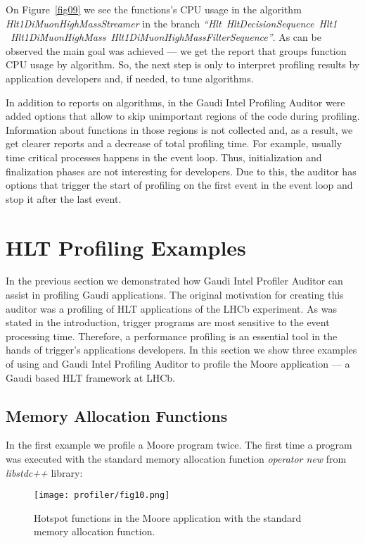 On Figure~\ref{fig09} we see the functions's CPU usage  in the algorithm {\it
Hlt1DiMuonHighMassStreamer\/} in the branch {\it ``Hlt~HltDecisionSequence~Hlt1
~Hlt1DiMuonHighMass~Hlt1DiMuonHighMassFilterSequence''}. As can be observed the
main goal was achieved --- we get the report that groups function CPU usage by
algorithm. So, the next step is only to interpret profiling results by
application developers and, if needed, to tune algorithms.

In addition to reports on algorithms, in the Gaudi Intel Profiling Auditor were
added options that allow to skip unimportant regions of the code during
profiling. Information about functions in those regions is not collected and,
as a result, we get clearer reports and a decrease of total profiling time. For
example, usually time critical processes happens in the event loop. Thus,
initialization and finalization phases are not interesting for developers. Due
to this, the auditor has options that trigger the start of  profiling on the
first event in the event loop and stop it after the last event.


\section{HLT Profiling Examples}

In the previous section we demonstrated how Gaudi Intel Profiler Auditor can
assist  in profiling Gaudi applications. The original motivation for creating
this auditor was a profiling of HLT applications of the LHCb experiment. As was
stated in the introduction, trigger programs are most sensitive to the event
processing time. Therefore, a performance profiling is an essential tool in the
hands of trigger's applications developers. In this section we show three
examples of using \amp and Gaudi Intel Profiling Auditor to profile the Moore
application --- a Gaudi based HLT framework at LHCb.

\subsection{Memory Allocation Functions}

In the first example we profile a Moore program twice. The first time a program
was executed with the standard memory allocation function {\it operator new\/}
from {\it libstdc++\/} library:

\begin{figure}[H]
\texttt{[image: profiler/fig10.png]}
\caption{Hotspot functions in the Moore application with the
standard memory allocation function.}
\label{fig10}
\end{figure}

